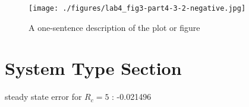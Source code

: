 \begin{figure}[H]
        \centering
        \texttt{[image: ./figures/lab4\_fig3-part4-3-2-negative.jpg]} %
        \caption{A one-sentence description of the plot or figure}
        \label{fig:name} %
\end{figure}

\section{System Type Section}


steady state error for $R_{c} = 5$ : -0.021496
